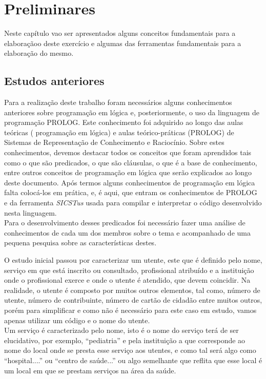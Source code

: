 \chapter{Preliminares}
\label{cap:p2}
Neste capítulo vao ser apresentados alguns conceitos fundamentais para a elaboraçãoo deste
exercício e algumas das ferramentas fundamentais para a elaboração do mesmo.


\section{Estudos anteriores}
\label{p2:estudp}
Para a realização deste trabalho foram necessários alguns conhecimentos anteriores sobre programação em lógica e, posteriormente, o uso da linguagem de programação PROLOG.
Este conhecimento foi adquirido ao longo das aulas teóricas ( programação em lógica) e aulas
teórico-práticas (PROLOG) de Sistemas de Representação de Conhecimento e Raciocínio.
Sobre estes conhecimentos, devemos destacar todos os conceitos que foram aprendidos tais
como o que são predicados, o que são cláusulas, o que é a base de conhecimento, entre outros
conceitos de programação em lógica que serão explicados ao longo deste documento.
Após termos alguns conhecimentos de programação em lógica falta colocá-los em prática,
e, é aqui, que entram os conhecimentos de PROLOG e da ferramenta \textit{SICSTus} usada para
compilar e interpretar o código desenvolvido nesta linguagem.
\\

Para o desenvolvimento desses predicados foi necessário fazer uma análise de conhecimentos de cada um dos membros sobre o tema e acompanhado de uma pequena pesquisa sobre as características destes.

O estudo inicial passou por caracterizar um utente, este que é definido pelo nome, serviço em que está inscrito ou consultado, profissional atribuído e a instituição onde o profissional exerce e onde o utente é atendido, que devem coincidir. Na realidade, o utente é composto por muitos outros elementos, tal como, número de utente, número de contribuinte, número de cartão de cidadão entre muitos outros, porém para simplificar e como não é necessário para este caso em estudo, vamos apenas utilizar um código e o nome do utente. 
\\

Um serviço é caracterizado pelo nome, isto é o nome do serviço terá de ser elucidativo, por exemplo, “pediatria” e pela instituição a que corresponde ao nome do local onde se presta esse serviço aos utentes, e como tal será algo como “hospital....” ou “centro de saúde...” ou algo semelhante que reflita que esse local é um local em que se prestam serviços na área da saúde.
\\

